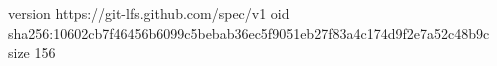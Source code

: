 version https://git-lfs.github.com/spec/v1
oid sha256:10602cb7f46456b6099c5bebab36ec5f9051eb27f83a4c174d9f2e7a52c48b9c
size 156
